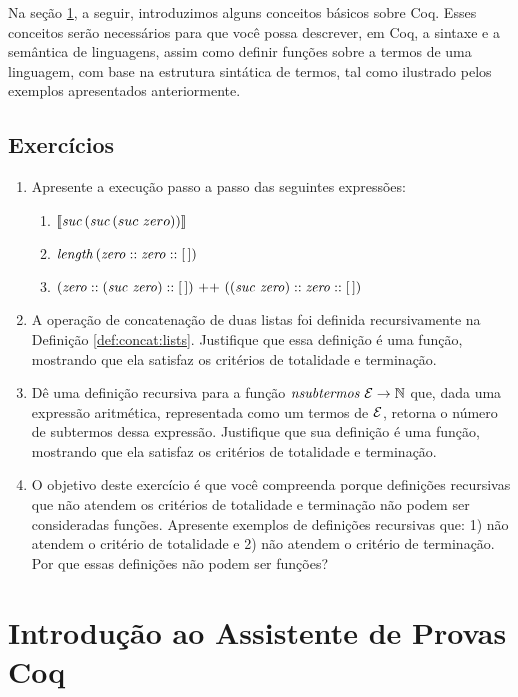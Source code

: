  Na se\c{c}\~ao \ref{cap1:coq}, a seguir, introduzimos alguns conceitos básicos sobre Coq. Esses conceitos serão necess\'arios para que você possa descrever, em Coq, a sintaxe e a semântica de linguagens, assim como definir funções sobre a termos de uma linguagem, com base na estrutura sint\'atica de termos, tal como ilustrado pelos exemplos apresentados anteriormente.

\subsection{Exerc\'icios}

\begin{enumerate}
  \item Apresente a execu\c{c}\~ao passo a passo das seguintes express\~oes:
  \begin{enumerate}
    \item $\llbracket \textit{suc\/}\, (\textit{suc\/}\, (suc\,\,zero))\rrbracket$ 
    \item $\textit{length\/}\, (\textit{zero\/} :: \textit{zero\/} :: [\,])$
    \item $(\textit{zero\/} :: (\textit{suc\/}\,\, \textit{zero\/}) ::[\,])\text{ ++ }((\textit{suc\/}\,\,\textit{zero\/}) :: \textit{zero\/} :: [\,])$
  \end{enumerate}
  \item A operação de concatenação de duas listas foi definida recursivamente na Definição \ref{def:concat:lists}. Justifique que essa definição é uma fun\c{c}\~ao, mostrando que ela satisfaz  os critérios de totalidade e termina\c{c}\~ao.
  \item Dê uma defini\c{c}\~ao recursiva para a função $\textit{nsubtermos }\mathcal{E} \rightarrow \mathbb{N}$ que, dada uma express\~ao aritm\'etica, representada como um termos de $\mathcal{E}$, retorna o número de subtermos dessa expressão. Justifique que sua definição é uma função, mostrando que ela satisfaz os critérios de totalidade e termina\c{c}\~ao.
  \item O objetivo deste exerc\'icio \'e que você compreenda porque defini\c{c}\~oes recursivas que n\~ao atendem os crit\'erios de totalidade e termina\c{c}\~ao n\~ao podem ser consideradas fun\c{c}\~oes. 
        Apresente exemplos de defini\c{c}\~oes recursivas que: 1) n\~ao atendem o crit\'erio de 
        totalidade e 2) n\~ao atendem o crit\'erio de termina\c{c}\~ao. Por que essas definições n\~ao podem ser fun\c{c}\~oes?        
\end{enumerate}

\section{Introdu\c{c}\~ao ao Assistente de Provas Coq}\label{cap1:coq}


